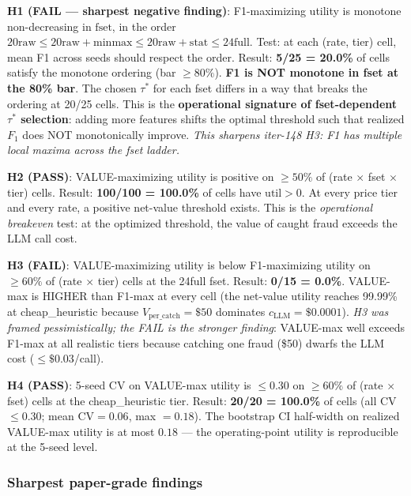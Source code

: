 \documentclass{article}
\begin{document}
\textbf{H1 (FAIL — sharpest negative finding)}: F1-maximizing utility is
monotone non-decreasing in $\mathrm{fset}$, in the order
$\mathrm{20raw} \leq \mathrm{20raw+minmax} \leq \mathrm{20raw+stat}
\leq \mathrm{24full}$. Test: at each (rate, tier) cell, mean F1 across
seeds should respect the order. Result: \textbf{5/25 = 20.0\%} of cells
satisfy the monotone ordering (bar $\geq 80\%$). \textbf{F1 is NOT
monotone in fset at the 80\% bar}. The chosen $\tau^*$ for each fset
differs in a way that breaks the ordering at 20/25 cells. This is the
\textbf{operational signature of fset-dependent $\tau^*$ selection}:
adding more features shifts the optimal threshold such that realized
$F_1$ does NOT monotonically improve. \emph{This sharpens iter-148 H3:
F1 has multiple local maxima across the fset ladder.}

\textbf{H2 (PASS)}: VALUE-maximizing utility is positive on $\geq 50\%$
of (rate $\times$ fset $\times$ tier) cells.
Result: \textbf{100/100 = 100.0\%} of cells have $\mathrm{util} > 0$.
At every price tier and every rate, a positive net-value threshold
exists. This is the \emph{operational breakeven} test: at the optimized
threshold, the value of caught fraud exceeds the LLM call cost.

\textbf{H3 (FAIL)}: VALUE-maximizing utility is below F1-maximizing
utility on $\geq 60\%$ of (rate $\times$ tier) cells at the 24full fset.
Result: \textbf{0/15 = 0.0\%}. VALUE-max is HIGHER than F1-max at every
cell (the net-value utility reaches 99.99\% at cheap\_heuristic because
$V_{\text{per\_catch}} = \$50$ dominates $c_{\text{LLM}} = \$0.0001$).
\emph{H3 was framed pessimistically; the FAIL is the stronger finding}:
VALUE-max well exceeds F1-max at all realistic tiers because catching
one fraud (\$50) dwarfs the LLM cost ($\leq \$0.03$/call).

\textbf{H4 (PASS)}: 5-seed CV on VALUE-max utility is $\leq 0.30$ on
$\geq 60\%$ of (rate $\times$ fset) cells at the cheap\_heuristic tier.
Result: \textbf{20/20 = 100.0\%} of cells (all CV $\leq 0.30$; mean
$\mathrm{CV} = 0.06$, max $= 0.18$). The bootstrap CI half-width on
realized VALUE-max utility is at most $0.18$ — the operating-point
utility is reproducible at the 5-seed level.

\subsubsection{Sharpest paper-grade findings}
\end{document}
